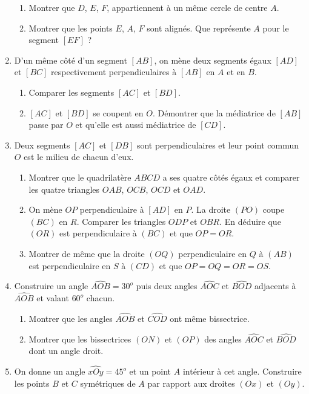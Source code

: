 \begin{enumerate}
\begin{enumerate}
 \item Montrer que $D$, $E$, $F$, appartiennent à un même cercle de centre $A$.
 \item Montrer que les points $E$, $A$, $F$ sont alignés. Que représente $A$ pour le segment $[EF]$ ?
 \end{enumerate}
 \item D'un même côté d'un segment $[AB]$, on mène deux segments égaux $[AD]$ et $[BC]$ respectivement perpendiculaires à $[AB]$ en $A$ et en $B$.
 \begin{enumerate}
 \item Comparer les segments $[AC]$ et $[BD]$. 
 \item $[AC]$ et $[BD]$ se coupent en $O$. Démontrer que la médiatrice de $[AB]$ passe par $O$ et qu'elle est aussi médiatrice de $[CD]$.
 \end{enumerate}
 \item Deux segments $[AC]$ et $[DB]$ sont perpendiculaires et leur point commun
 $O$ est le milieu de chacun d'eux. \begin{enumerate}
 \item Montrer que le quadrilatère $ABCD$ a ses quatre côtés égaux et comparer les 
 quatre triangles $OAB$, $OCB$, $OCD$ et $OAD$.
 \item On mène $OP$ perpendiculaire à $[AD]$ en $P$. La droite $(PO)$ coupe $(BC)$ en 
 $R$. Comparer les triangles $ODP$ et $OBR$. En déduire que $(OR)$ est perpendiculaire à $(BC)$ et que $OP=OR$. 
 \item Montrer de même que la droite $(OQ)$ perpendiculaire en $Q$ à $(AB)$ est 
 perpendiculaire en $S$ à $(CD)$ et que $OP=OQ=OR=OS$. 
 \end{enumerate}
 \item Construire un angle $\widehat{AOB}=30^o$ puis deux angles $\widehat{AOC}$ et
 $\widehat{BOD}$ adjacents à $\widehat{AOB}$ et valant $60^o$ chacun. \begin{enumerate}
 \item Montrer que les angles $\widehat{AOB}$ et $\widehat{COD}$ ont même bissectrice.
 \item Montrer que les bissectrices $(ON)$ et $(OP)$ des angles $\widehat{AOC}$ et $\widehat{BOD}$ dont un angle droit.
 \end{enumerate}
 \item On donne un angle $\widehat{xOy}=45^o$ et un point $A$ intérieur à cet angle.
 Construire les points $B$ et $C$ symétriques de $A$ par rapport aux droites
 $(Ox)$ et $(Oy)$.\begin{enumerate}

\end{enumerate}
\end{enumerate}
